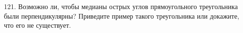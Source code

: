 121. Возможно ли, чтобы медианы острых углов прямоугольного треугольника были перпендикулярны? Приведите пример такого треугольника или докажите, что его не существует.\\
